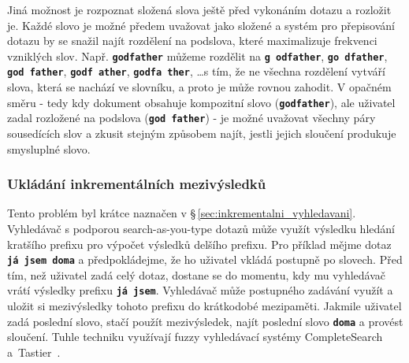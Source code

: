 \documentclass[11pt,letterpaper,oneside,openright]{book}
\newcommand{\bftt}[1]{\texttt{\textbf{#1}}}
\begin{document}
Jiná možnost je rozpoznat složená slova ještě před vykonáním dotazu a rozložit
je. Každé slovo je možné předem uvažovat jako složené a systém pro přepisování
dotazu by se snažil najít rozdělení na podslova, které maximalizuje frekvenci
vzniklých slov. Např. \bftt{godfather} můžeme rozdělit na \bftt{g odfather},
\bftt{go dfather}, \bftt{god father}, \bftt{godf ather}, \bftt{godfa ther},
\ldots s tím, že ne všechna rozdělení vytváří slova, která se nachází ve
slovníku, a proto je může rovnou zahodit. V opačném směru - tedy kdy dokument
obsahuje kompozitní slovo (\bftt{godfather}), ale uživatel zadal rozložené na
podslova (\bftt{god father}) - je možné uvažovat všechny páry sousedících slov
a zkusit stejným způsobem najít, jestli jejich sloučení produkuje smysluplné
slovo.

\subsubsection{Ukládání inkrementálních mezivýsledků}
Tento problém byl krátce naznačen v \S\,\ref{sec:inkrementalni_vyhledavani}.
Vyhledávač s podporou search-as-you-type dotazů může využít výsledku hledání
kratšího prefixu pro výpočet výsledků delšího prefixu. Pro příklad mějme dotaz
\bftt{já jsem doma} a předpokládejme, že ho uživatel vkládá postupně po
slovech. Před tím, než uživatel zadá celý dotaz, dostane se do momentu, kdy mu
vyhledávač vrátí výsledky prefixu \bftt{já jsem}. Vyhledávač může postupného
zadávání využít a uložit si mezivýsledky tohoto prefixu do krátkodobé
mezipaměti. Jakmile uživatel zadá poslední slovo, stačí použít mezivýsledek,
najít poslední slovo \bftt{doma} a provést sloučení. Tuhle techniku využívají
fuzzy vyhledávací systémy CompleteSearch~\cite{Bast:2006:TLF:1148170.1148234}
a~Tastier~\cite{Ji:2009:EIF:1526709.1526760}.

\end{document}
